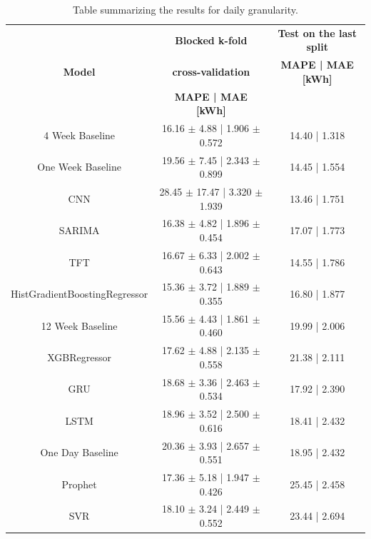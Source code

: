 \begin{table}[H]
\centering
\begin{tabular}{|c|c|c|}
\hline
 & \textbf{Blocked k-fold} & \textbf{Test on the last split}\\
\textbf{Model} & \textbf{cross-validation} & \textbf{MAPE | MAE [kWh]}\\
 & \textbf{MAPE | MAE [kWh]} & \\
\hline
4 Week Baseline & 16.16 $\pm$ 4.88 | 1.906 $\pm$ 0.572 & 14.40 | 1.318\\
\hline
One Week Baseline & 19.56 $\pm$ 7.45 | 2.343 $\pm$ 0.899 & 14.45 | 1.554\\
\hline
CNN & 28.45 $\pm$ 17.47 | 3.320 $\pm$ 1.939 & 13.46 | 1.751\\
\hline
SARIMA & 16.38 $\pm$ 4.82 | 1.896 $\pm$ 0.454 & 17.07 | 1.773\\
\hline
TFT & 16.67 $\pm$ 6.33 | 2.002 $\pm$ 0.643 & 14.55 | 1.786\\
\hline
HistGradientBoostingRegressor & 15.36 $\pm$ 3.72 | 1.889 $\pm$ 0.355 & 16.80 | 1.877\\
\hline
12 Week Baseline & 15.56 $\pm$ 4.43 | 1.861 $\pm$ 0.460 & 19.99 | 2.006\\
\hline
XGBRegressor & 17.62 $\pm$ 4.88 | 2.135 $\pm$ 0.558 & 21.38 | 2.111\\
\hline
GRU & 18.68 $\pm$ 3.36 | 2.463 $\pm$ 0.534 & 17.92 | 2.390\\
\hline
LSTM & 18.96 $\pm$ 3.52 | 2.500 $\pm$ 0.616 & 18.41 | 2.432\\
\hline
One Day Baseline & 20.36 $\pm$ 3.93 | 2.657 $\pm$ 0.551 & 18.95 | 2.432\\
\hline
Prophet & 17.36 $\pm$ 5.18 | 1.947 $\pm$ 0.426 & 25.45 | 2.458\\
\hline
SVR & 18.10 $\pm$ 3.24 | 2.449 $\pm$ 0.552 & 23.44 | 2.694\\
\hline
\end{tabular}
\caption{Table summarizing the results for daily granularity.}
\label{tab:baselinedailyresults}
\end{table}

